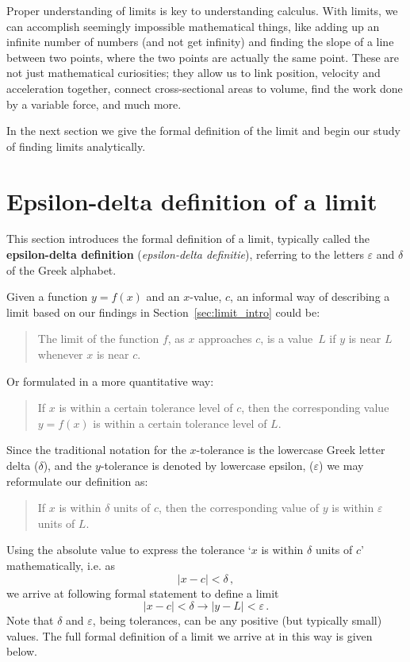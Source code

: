 Proper understanding of limits is key to understanding calculus. With limits, we can accomplish seemingly impossible mathematical things, like adding up an infinite number of numbers (and not get infinity) and finding the slope of a line between two points, where the two points are actually the same point. These are not just mathematical curiosities; they allow us to link position, velocity and acceleration together, connect cross-sectional areas to volume, find the work done by a variable force, and much more. 

In the next section we give the formal definition of the limit and begin our study of finding limits analytically.

\fi




\section{Epsilon-delta definition of a limit}\label{sec:limit_def}
This section introduces the formal definition of a limit, typically called the \textbf{epsilon-delta definition} (\textit{epsilon-delta definitie}), referring to the letters $\varepsilon$ and $\delta$ of the Greek alphabet.

\ifcalculus
Given a function $y=f(x)$ and an $x$-value, $c$, an informal way of describing a limit based on our findings in Section~\ref{sec:limit_intro} could be: 
\begin{quote}
The limit of the function $f$, as $x$ approaches $c$, is a value~$L$ if $y$ is near $L$  whenever $x$ is near $c$.
\end{quote}
Or formulated in a more quantitative way:

\begin{quote}
If $x$ is within a certain tolerance level of $c$, then the corresponding value $y=f(x)$ is within a certain tolerance level of $L$.
\end{quote}

Since the traditional notation for the $x$-tolerance is the lowercase Greek letter delta ($\delta$), and the $y$-tolerance is denoted by lowercase epsilon, ($\varepsilon$) we may reformulate our definition as:

\begin{quote}
If $x$ is within $\delta$ units of $c$, then the corresponding value of $y$ is within $\varepsilon$ units of $L$.
\end{quote}

Using the absolute value to express the tolerance `$x$ is within $\delta$ units of $c$' mathematically, i.e. as 
$$|x-c| < \delta\,, $$
we arrive at following formal statement to define a limit
$$
|x - c| < \delta \longrightarrow  |y - L| < \varepsilon\,.
$$
Note that $\delta$ and $\varepsilon$, being tolerances, can be any positive (but typically small) values. The full formal definition of a limit we arrive at in this way is given below. 

